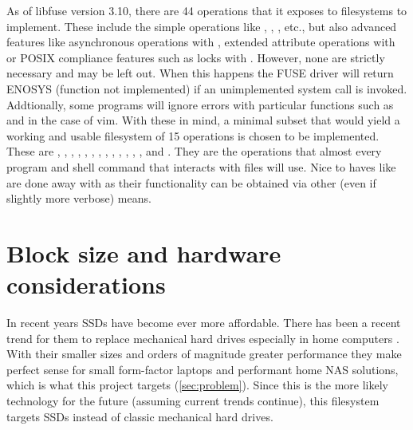         As of libfuse version 3.10, there are 44 operations that it exposes to
        filesystems to implement. These include the simple operations like
        , , , etc., but also
        advanced features like asynchronous operations with ,
        extended attribute operations with  or POSIX
        compliance features such as locks with . However, none
        are strictly necessary and may be left out. When this happens the FUSE driver will
        return ENOSYS (function not implemented) if an unimplemented system
        call is invoked. Addtionally, some programs will ignore errors with
        particular functions such as  and  in
        the case of vim. With these in mind, a minimal subset that would yield a
        working and usable filesystem of 15 operations is chosen to be
        implemented. These are , ,
        , , ,
        , , , ,
        , , , ,
         and . They are the operations that
        almost every program and shell command that interacts with files will
        use. Nice to haves like  are done away with as their
        functionality can be obtained via other (even if slightly more verbose)
        means.

    \section{Block size and hardware considerations}
        \label{sec:block_size}

        In recent years SSDs have become ever more affordable. There has been a
        recent trend for them to replace mechanical hard drives
        especially in home computers \cite{SSD_sales}. With their smaller sizes
        and orders of magnitude greater performance they make perfect sense for
        small form-factor laptops and performant home NAS solutions, which is
        what this project targets (\autoref{sec:problem}). Since this is the more
        likely technology for the future (assuming current trends continue), this
        filesystem targets SSDs instead of classic mechanical hard drives.

